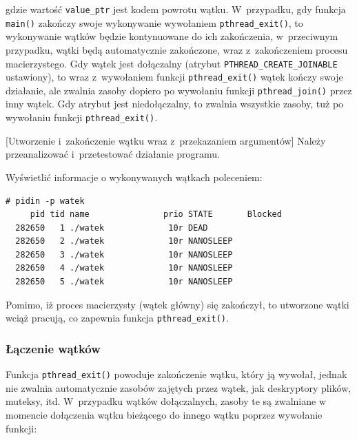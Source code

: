 gdzie wartość \lstinline[style=MyCStyle]{value_ptr} jest kodem powrotu wątku. W~przypadku, gdy funkcja \lstinline[style=MyCStyle]{main()} zakończy swoje wykonywanie wywołaniem \lstinline[style=MyCStyle]{pthread_exit()}, to wykonywanie wątków będzie kontynuowane do ich zakończenia, w~przeciwnym przypadku, wątki będą automatycznie zakończone, wraz z~zakończeniem procesu macierzystego. Gdy wątek jest dołączalny (atrybut \lstinline[style=MyCStyle]{PTHREAD_CREATE_JOINABLE} ustawiony), to wraz z~wywołaniem funkcji \lstinline[style=MyCStyle]{pthread_exit()} wątek kończy swoje działanie, ale zwalnia zasoby dopiero po wywołaniu funkcji \lstinline[style=MyCStyle]{pthread_join()} przez inny wątek. Gdy atrybut jest niedołączalny, to zwalnia wszystkie zasoby, tuż po wywołaniu funkcji  \lstinline[style=MyCStyle]{pthread_exit()}.


\begin{example}{[Utworzenie i~zakończenie wątku wraz z~przekazaniem argumentów]}
Należy przeanalizować i~przetestować działanie programu.




Wyświetlić informacje o wykonywanych wątkach poleceniem:

\begin{lstlisting}[style=MyCStyle]
# pidin -p watek
     pid tid name               prio STATE       Blocked
  282650   1 ./watek             10r DEAD
  282650   2 ./watek             10r NANOSLEEP
  282650   3 ./watek             10r NANOSLEEP
  282650   4 ./watek             10r NANOSLEEP
  282650   5 ./watek             10r NANOSLEEP
\end{lstlisting}

Pomimo, iż proces macierzysty (wątek główny) się zakończył, to utworzone wątki wciąż pracują, co zapewnia funkcja  \lstinline[style=MyCStyle]{pthread_exit()}.
\end{example}

\subsubsection{Łączenie wątków}

Funkcja \lstinline[style=MyCStyle]{pthread_exit()} powoduje zakończenie wątku, który ją wywołał, jednak nie zwalnia automatycznie zasobów zajętych przez wątek, jak deskryptory plików, muteksy, itd. W~przypadku wątków dołączalnych, zasoby te są zwalniane w momencie dołączenia wątku bieżącego do innego wątku poprzez wywołanie funkcji:

